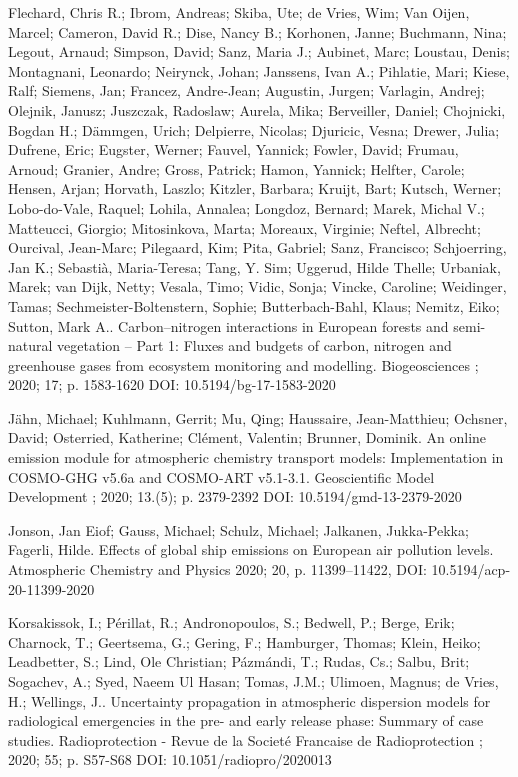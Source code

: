 \begin{list}{}{\setlength{\leftmargin}{15pt}\setlength{\itemindent}{-\leftmargin}}
\item[]
Flechard, Chris R.; Ibrom, Andreas; Skiba, Ute; de Vries, Wim; Van Oijen, Marcel; Cameron, David R.; Dise, Nancy B.; Korhonen, Janne; Buchmann, Nina; Legout, Arnaud; Simpson, David; Sanz, Maria J.; Aubinet, Marc; Loustau, Denis; Montagnani, Leonardo; Neirynck, Johan; Janssens, Ivan A.; Pihlatie, Mari; Kiese, Ralf; Siemens, Jan; Francez, Andre-Jean; Augustin, Jurgen; Varlagin, Andrej; Olejnik, Janusz; Juszczak, Radoslaw; Aurela, Mika; Berveiller, Daniel; Chojnicki, Bogdan H.; Dämmgen, Urich; Delpierre, Nicolas; Djuricic, Vesna; Drewer, Julia; Dufrene, Eric; Eugster, Werner; Fauvel, Yannick; Fowler, David; Frumau, Arnoud; Granier, Andre; Gross, Patrick; Hamon, Yannick; Helfter, Carole; Hensen, Arjan; Horvath, Laszlo; Kitzler, Barbara; Kruijt, Bart; Kutsch, Werner; Lobo-do-Vale, Raquel; Lohila, Annalea; Longdoz, Bernard; Marek, Michal V.; Matteucci, Giorgio; Mitosinkova, Marta; Moreaux, Virginie; Neftel, Albrecht; Ourcival, Jean-Marc; Pilegaard, Kim; Pita, Gabriel; Sanz, Francisco; Schjoerring, Jan K.; Sebastià, Maria-Teresa; Tang, Y. Sim; Uggerud, Hilde Thelle; Urbaniak, Marek; van Dijk, Netty; Vesala, Timo; Vidic, Sonja; Vincke, Caroline; Weidinger, Tamas; Sechmeister-Boltenstern, Sophie; Butterbach-Bahl, Klaus; Nemitz, Eiko; Sutton, Mark A..
Carbon–nitrogen interactions in European forests and semi-natural vegetation – Part 1: Fluxes and budgets of carbon, nitrogen and greenhouse gases from ecosystem monitoring and modelling.
Biogeosciences ; 2020; 17; p. 1583-1620
DOI: 10.5194/bg-17-1583-2020

\item[]
Jähn, Michael; Kuhlmann, Gerrit; Mu, Qing; Haussaire, Jean-Matthieu; Ochsner, David; Osterried, Katherine; Clément, Valentin; Brunner, Dominik.
An online emission module for atmospheric chemistry transport models: Implementation in COSMO-GHG v5.6a and COSMO-ART v5.1-3.1.
Geoscientific Model Development ; 2020; 13.(5); p. 2379-2392
DOI: 10.5194/gmd-13-2379-2020

\item[]
Jonson, Jan Eiof; Gauss, Michael; Schulz, Michael; Jalkanen, Jukka-Pekka; Fagerli, Hilde.
Effects of global ship emissions on European air pollution levels.
Atmospheric Chemistry and Physics 2020; 20, p. 11399–11422,
DOI: 10.5194/acp-20-11399-2020

\item[]
Korsakissok, I.; Périllat, R.; Andronopoulos, S.; Bedwell, P.; Berge, Erik; Charnock, T.; Geertsema, G.; Gering, F.; Hamburger, Thomas; Klein, Heiko; Leadbetter, S.; Lind, Ole Christian; Pázmándi, T.; Rudas, Cs.; Salbu, Brit; Sogachev, A.; Syed, Naeem Ul Hasan; Tomas, J.M.; Ulimoen, Magnus; de Vries, H.; Wellings, J..
Uncertainty propagation in atmospheric dispersion models for radiological emergencies in the pre- and early release phase: Summary of case studies.
Radioprotection - Revue de la Societé Francaise de Radioprotection ; 2020; 55; p. S57-S68
DOI: 10.1051/radiopro/2020013 


\end{list}
